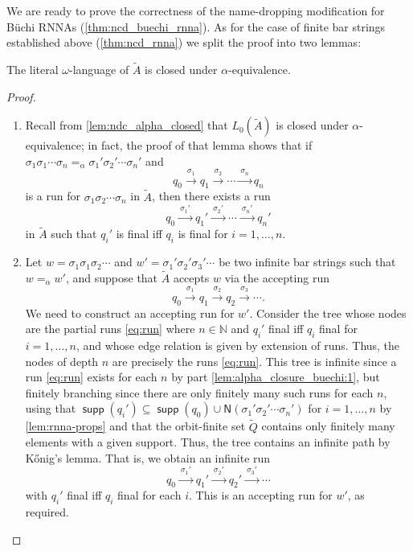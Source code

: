 \documentclass[10pt,a4paper]{amsart}
\newcommand{\Names}[1]{\mathsf{N}(#1)}
\numberwithin{equation}{section}
\newcommand{\xto}[1]{\xrightarrow{~#1~}}
\newcommand{\seq}{\subseteq}
\newcommand{\tl}{\widetilde}
\newcommand{\Nat}{{\mathbb{N}}}
\newcommand{\+}[1]{\mathcal{#1}\xspace}
\DeclareMathOperator{\supp}{\mathsf{supp}} %
\theoremstyle{definition}
\begin{document}
We are ready to prove the correctness of the name-dropping modification for Büchi RNNAs (\autoref{thm:ncd_buechi_rnna}). As for the case of finite bar strings established above  (\autoref{thm:ncd_rnna}) we split the proof into two lemmas:
%
\begin{lemma}\label{lem:alpha_closure_buechi}
  The literal $\omega$-language of $\tl{A}$ is closed under $\alpha$-equivalence.
\end{lemma}
%
\begin{proof}
  \begin{enumerate}
  \item\label{lem:alpha_closure_buechi:1} Recall from \autoref{lem:ndc_alpha_closed} that $L_0(\tl{A})$
    is closed under $\alpha$-equivalence; in fact, the proof of that
    lemma shows that if
    $\sigma_1\sigma_1\cdots \sigma_n=_\alpha \sigma_1'\sigma_2'\cdots
    \sigma_n'$ and
    \[
      q_0\xto{\sigma_1} q_1\xto{\sigma_2} \cdots \xto{\sigma_n} q_n
    \]
    is a run for $\sigma_1\sigma_2\cdots \sigma_n$ in $\tl{A}$, then
    there exists a run
    \begin{equation}\label{eq:run}
      q_0\xto{\sigma_1'} q_1'\xto{\sigma_2'} \cdots \xto{\sigma_n'}
      q_n'
    \end{equation}
    in $\tl{A}$ such that $q_i'$ is final iff $q_i$ is final for
    $i=1,\ldots, n$.%
    
  \item Let $w=\sigma_1\sigma_1\sigma_2\cdots$ and
    $w'=\sigma_1'\sigma_2'\sigma_3'\cdots$ be two infinite bar strings
    such that $w=_\alpha w'$, and suppose that $\tl{A}$ accepts $w$
    via the accepting run
    \[
      q_0\xto{\sigma_1} q_1\xto{\sigma_2} q_2\xto{\sigma_3}\cdots.
    \]
    We need to construct an accepting run for $w'$. Consider the tree
    whose nodes are the partial runs \eqref{eq:run} where $n\in \Nat$
    and $q_i'$ final iff $q_i$ final for $i=1,\ldots, n$, and whose
    edge relation is given by extension of runs. Thus, the nodes of
    depth $n$ are precisely the runs \eqref{eq:run}. This tree is
    infinite since a run \eqref{eq:run} exists for each $n$ by
    part \ref{lem:alpha_closure_buechi:1}, but finitely branching since there are only finitely
    many such runs for each $n$, using that
    $\supp(q_i')\seq \supp(q_0)\cup \Names{\sigma_1'\sigma_2'\cdots
      \sigma_n'}$ for $i=1,\ldots,n$ by \autoref{lem:rnna-props} and that the orbit-finite set $\tl{Q}$
    contains only finitely many elements with a given support. Thus,
    the tree contains an infinite path by K\H{o}nig's lemma. That is,
    we obtain an infinite run
    \[
      q_0\xto{\sigma_1'} q_1'\xto{\sigma_2'} q_2'\xto{\sigma_3'}\cdots
    \]
    with $q_i'$ final iff $q_i$ final for each $i$. This is an
    accepting run for $w'$, as required.\qedhere
  \end{enumerate}
\end{proof}
\end{document}
